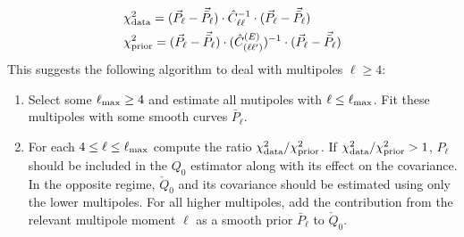 \documentclass[12pt,a4paper]{article}
\newcommand{\be}{\begin{equation}}
\newcommand{\ee}{\end{equation}}
\newcommand{\lmax}{\ell_{\rm max}}
\begin{document}
\be
\begin{split}
& \chi^2_{\rm data}=(\vec{P}_{\ell}-\vec{\bar{P}}_{\ell})
\cdot 
\hat{C}^{-1}_{\ell\ell}
\cdot 
(\vec{P}_{\ell}-\vec{\bar{P}}_{\ell})\\
& \chi^2_{\rm prior}= (\vec{P}_{\ell}-\vec{\bar{P}}_{\ell})
\cdot (\hat{C}^{(E)}_{(\ell \ell')})^{-1}\cdot 
(\vec{P}_{\ell}-\vec{\bar{P}}_{\ell})
\end{split} 
\ee
This suggests the following algorithm to deal with multipoles $\ell \geq 4$:
\begin{enumerate}
	\item Select some $\lmax\geq 4$ and estimate all mutipoles with $\ell \leq \lmax$. Fit these multipoles with some smooth curves $\bar P_\ell$.
	\item For each $4\leq \ell\leq \lmax$ compute the ratio 
	$\chi^2_{\rm data}/\chi^2_{\rm prior}$. 
	If $\chi^2_{\rm data}/\chi^2_{\rm prior}>1$, $P_\ell$ should be included in the $Q_0$ estimator along with its effect on the covariance. In the opposite regime, $\check{Q}_0$ and its covariance should be estimated using only the lower multipoles. For all higher multipoles, add the contribution from the relevant multipole moment $\ell$
	as a smooth prior $\bar P_\ell$  
	to $\check{Q}_0$.
\end{enumerate}
\end{document}
